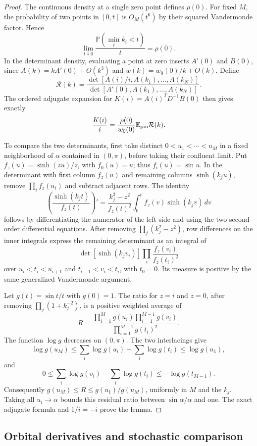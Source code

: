 \begin{proof}
The continuous density at a single zero point defines $\rho(0)$.
For fixed $M$, the probability of two points in $[0,t]$ is $O_M(t^6)$
by their squared Vandermonde factor. Hence
\[
 \lim_{t\downarrow0}\frac{\mathbb P(\min_i k_i<t)}t=\rho(0).
\]
In the determinant density, evaluating a point at zero inserts
$A'(0)$ and $B(0)$, since $A(k)=kA'(0)+O(k^3)$ and
$w(k)=w_0(0)/k+O(k)$. Define
\[
 \mathcal R(k)=
 \frac{\det[A(i)/i,A(k_1),\ldots,A(k_N)]}
      {\det[A'(0),A(k_1),\ldots,A(k_N)]}.
\]
The ordered adjugate expansion for $K(i)=A(i)^TD^{-1}B(0)$ then gives
exactly
\[
 \frac{K(i)}i=\frac{\rho(0)}{w_0(0)}
 \mathbb E_{\rm pin}\mathcal R(k).
\]

To compare the two determinants, first take distinct
$0<u_1<\cdots<u_M$ in a fixed neighborhood of $\alpha$ contained in
$(0,\pi)$, before taking their confluent limit. Put
$f_z(u)=\sinh(zu)/z$, with $f_0(u)=u$; thus $f_i(u)=\sin u$.
In the determinant with first column $f_z(u)$ and remaining columns
$\sinh(k_j u)$, remove $\prod_i f_z(u_i)$ and subtract adjacent rows.
The identity
\[
 \left(\frac{\sinh(k_jt)}{f_z(t)}\right)'
 =\frac{k_j^2-z^2}{f_z(t)^2}
   \int_0^t f_z(v)\sinh(k_jv)\,dv
\]
follows by differentiating the numerator of the left side and using the
two second-order differential equations. After removing
$\prod_j(k_j^2-z^2)$, row differences on the inner integrals express the
remaining determinant as an integral of
\[
 \det[\sinh(k_jv_i)]\prod_i\frac{f_z(v_i)}{f_z(t_i)^2}
\]
over $u_i<t_i<u_{i+1}$ and $t_{i-1}<v_i<t_i$, with $t_0=0$.
Its measure is positive by the same generalized Vandermonde argument.

Let $g(t)=\sin t/t$ with $g(0)=1$. The ratio for $z=i$ and $z=0$,
after removing $\prod_j(1+k_j^{-2})$, is a positive weighted average of
\[
 R=\frac{\prod_{i=1}^M g(u_i)\prod_{i=1}^{M-1}g(v_i)}
         {\prod_{i=1}^{M-1}g(t_i)^2}.
\]
The function $\log g$ decreases on $(0,\pi)$. The two interlacings give
\[
 \log g(u_M)\le\sum_i\log g(u_i)-\sum_i\log g(t_i)
 \le\log g(u_1),
\]
and
\[
 0\le\sum_i\log g(v_i)-\sum_i\log g(t_i)
 \le-\log g(t_{M-1}).
\]
Consequently $g(u_M)\le R\le g(u_1)/g(u_M)$, uniformly in $M$ and the
$k_j$. Taking all $u_i\to\alpha$ bounds this residual ratio between
$\sin\alpha/\alpha$ and one. The exact adjugate formula and $1/i=-i$
prove the lemma.
\end{proof}

\subsection{Orbital derivatives and stochastic comparison}

